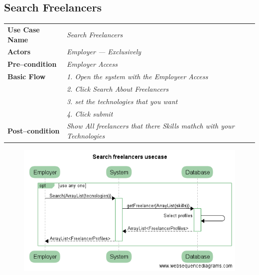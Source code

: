 \documentclass{article}
\begin{document}
\newpage

\subsection{Search Freelancers}
    \begin{tabular}{ l | l }
    \toprule
      \rowcolor{LightCyan}
      \textbf{Use Case Name}    & \textit{Search Freelancers}\\
      \textbf{Actors}           & \textit{Employer --- Exclusively}\\
      \rowcolor{LightCyan}
      \textbf{Pre--condition}   & \textit{Employer Access}\\
      \textbf{Basic Flow}       & \textit{1. Open the system with the Employeer Access}\\
                                & \textit{2. Click Search About Freelancers}\\
                                & \textit{3. set the technologies that you want}\\
                                & \textit{4. Click submit}\\
      \rowcolor{LightCyan}
      \textbf{Post--condition}  & \textit{Show All freelancers that there Skills mathch with your Technologies}\\
    \toprule
    \end{tabular}

\begin{figure}[ht!]
\centering
\includegraphics[width=128mm]{Search_Freelancers_usecase.png}
\end{figure}



\newpage
\end{document}

